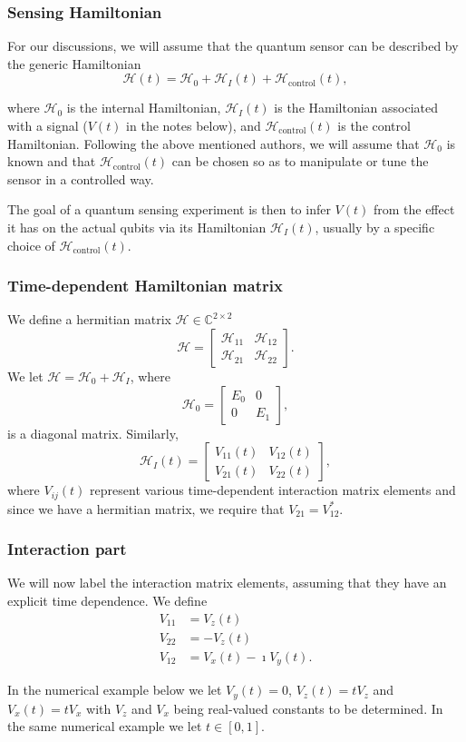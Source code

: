 \documentclass{beamer}
\begin{document}
\begin{frame}
\frametitle{Sensing Hamiltonian}

For our discussions, we will assume that the quantum sensor can be
described by the generic Hamiltonian
\[
\mathcal{H}(t) = \mathcal{H}_0 + \mathcal{H}_I(t) + \mathcal{H}_\mathrm{control}(t),
\]

where $\mathcal{H}_0$ is the internal Hamiltonian, $\mathcal{H}_I(t)$ is the
Hamiltonian associated with a signal ($V(t)$ in the notes below), and
$\mathcal{H}_\mathrm{control}(t)$ is the control Hamiltonian.  Following
the above mentioned authors, we will assume that $\mathcal{H}_0$ is known
and that $\mathcal{H}_\mathrm{control}(t)$ can be chosen so as to
manipulate or tune the sensor in a controlled way.

The goal of a quantum sensing experiment is then to infer $V(t)$ from
the effect it has on the actual qubits via its Hamiltonian
$\mathcal{H}_I(t)$, usually by a specific choice of
$\mathcal{H}_\mathrm{control}(t)$.
\end{frame}

\begin{frame}
\frametitle{Time-dependent Hamiltonian matrix}

We define a  hermitian  matrix  $\mathcal{H}\in {\mathbb{C}}^{2\times 2}$
\[
\mathcal{H} = \begin{bmatrix} \mathcal{H}_{11} & \mathcal{H}_{12} \\ \mathcal{H}_{21} & \mathcal{H}_{22}
\end{bmatrix}.
\]
We  let $\mathcal{H} = \mathcal{H}_0 + \mathcal{H}_I$, where
\[
\mathcal{H}_0= \begin{bmatrix} E_0 & 0 \\ 0 & E_1\end{bmatrix},
\]
is a diagonal matrix. Similarly,
\[
\mathcal{H}_I(t)= \begin{bmatrix} V_{11}(t) & V_{12}(t) \\ V_{21}(t) & V_{22}(t)\end{bmatrix},
\]
where $V_{ij}(t)$ represent various time-dependent interaction matrix elements and since we have a hermitian matrix, we require that
$V_{21}=V_{12}^*$.
\end{frame}

\begin{frame}
\frametitle{Interaction part}

We will now label  the interaction matrix elements, assuming that they have an explicit time dependence.
We define
\begin{align*}
V_{11} & = V_z(t)\\
V_{22} & = -V_z(t)\\
V_{12} & = V_x(t)-\imath V_y(t).
\end{align*}

In the numerical example below we let $V_y(t)=0$, $V_z(t) = tV_z$
and $V_x(t) = tV_x$ with $V_z$ and $V_x$ being real-valued constants to
be determined. In the same numerical example we let $t\in [0,1]$.
\end{frame}
\end{document}
